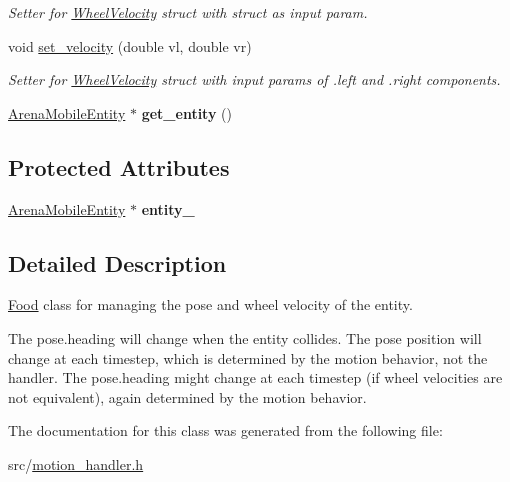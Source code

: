 \begin{DoxyCompactItemize}
\begin{DoxyCompactList}\small\item\em Setter for \hyperlink{structWheelVelocity}{Wheel\+Velocity} struct with struct as input param. \end{DoxyCompactList}\item 
void \hyperlink{classMotionHandler_af31975aa667ca20835e4d5bb0216706e}{set\+\_\+velocity} (double vl, double vr)\hypertarget{classMotionHandler_af31975aa667ca20835e4d5bb0216706e}{}\label{classMotionHandler_af31975aa667ca20835e4d5bb0216706e}

\begin{DoxyCompactList}\small\item\em Setter for \hyperlink{structWheelVelocity}{Wheel\+Velocity} struct with input params of .left and .right components. \end{DoxyCompactList}\item 
\hyperlink{classArenaMobileEntity}{Arena\+Mobile\+Entity} $\ast$ {\bfseries get\+\_\+entity} ()\hypertarget{classMotionHandler_ad8472612d15be1ada7f919f45d245adc}{}\label{classMotionHandler_ad8472612d15be1ada7f919f45d245adc}

\end{DoxyCompactItemize}
\subsection*{Protected Attributes}
\begin{DoxyCompactItemize}
\item 
\hyperlink{classArenaMobileEntity}{Arena\+Mobile\+Entity} $\ast$ {\bfseries entity\+\_\+}\hypertarget{classMotionHandler_a659fd1ec8878260a63779bf45681f5a4}{}\label{classMotionHandler_a659fd1ec8878260a63779bf45681f5a4}

\end{DoxyCompactItemize}


\subsection{Detailed Description}
\hyperlink{classFood}{Food} class for managing the pose and wheel velocity of the entity. 

The pose.\+heading will change when the entity collides. The pose position will change at each timestep, which is determined by the motion behavior, not the handler. The pose.\+heading might change at each timestep (if wheel velocities are not equivalent), again determined by the motion behavior. 

The documentation for this class was generated from the following file\+:\begin{DoxyCompactItemize}
\item 
src/\hyperlink{motion__handler_8h}{motion\+\_\+handler.\+h}\end{DoxyCompactItemize}

